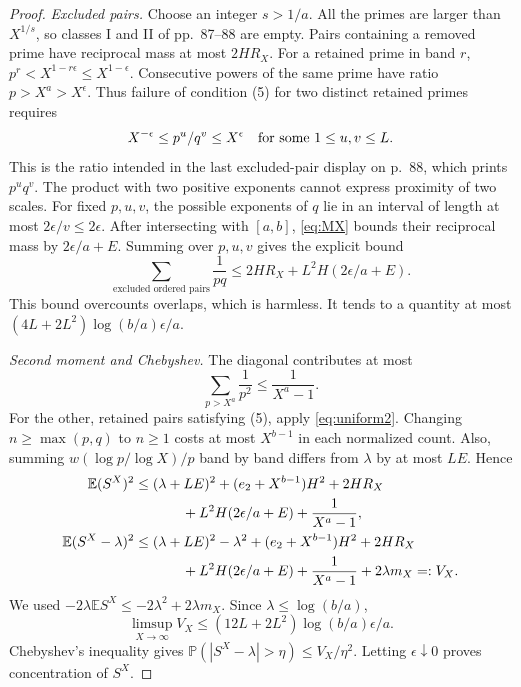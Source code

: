 \documentclass[10pt]{article}
\theoremstyle{remark}
\newcommand{\E}{\mathbb E}
\newcommand{\Prob}{\mathbb P}
\begin{document}
\begin{proof}
\emph{Excluded pairs.} Choose an integer $s>1/a$. All the primes are
larger than $X^{1/s}$, so classes I and II of pp.~87--88 are empty.
Pairs containing a removed prime have reciprocal mass at most $2HR_X$.
For a retained prime in band $r$, $p^r<X^{1-r\epsilon}\leq
X^{1-\epsilon}$. Consecutive powers of the same prime have ratio
$p>X^a>X^\epsilon$. Thus failure of condition (5) for two distinct
retained primes requires
\begin{equation}\label{eq:ratio}
 X^{-\epsilon}\leq p^u/q^v\leq X^\epsilon
 \quad\hbox{for some }1\leq u,v\leq L.
\end{equation}
This is the ratio intended in the last excluded-pair display on p.~88,
which prints $p^u q^v$. The product with two positive exponents cannot
express proximity of two scales.
For fixed $p,u,v$, the possible exponents of $q$ lie in an interval
of length at most $2\epsilon/v\leq2\epsilon$. After intersecting with
$[a,b]$, \eqref{eq:MX} bounds their reciprocal mass by
$2\epsilon/a+E$. Summing over $p,u,v$ gives the explicit bound
\begin{equation}\label{eq:badpairs}
 \sum_{\text{excluded ordered pairs}}\frac1{pq}
 \leq2HR_X+L^2H(2\epsilon/a+E).
\end{equation}
This bound overcounts overlaps, which is harmless. It tends to a
quantity at most $(4L+2L^2)\log(b/a)\epsilon/a$.

\emph{Second moment and Chebyshev.} The diagonal contributes at most
\[
 \sum_{p>X^a}\frac1{p^2}\leq\frac1{X^a-1}.
\]
For the other, retained pairs satisfying (5), apply \eqref{eq:uniform2}.
Changing $n\geq\max(p,q)$ to $n\geq1$ costs at most $X^{b-1}$ in
each normalized count. Also, summing $w(\log p/\log X)/p$ band by
band differs from $\lambda$ by at most $LE$. Hence
\begin{align}
 \E (S^X)^2&\leq (\lambda+LE)^2+(e_2+X^{b-1})H^2+2HR_X\notag\\
 &\hspace{12mm}+L^2H(2\epsilon/a+E)+\frac1{X^a-1},\label{eq:second}\\
 \E(S^X-\lambda)^2&\leq
 (\lambda+LE)^2-\lambda^2+(e_2+X^{b-1})H^2+2HR_X\notag\\
 &\hspace{12mm}+L^2H(2\epsilon/a+E)+\frac1{X^a-1}
       +2\lambda m_X=:V_X.\label{eq:variance}
\end{align}
We used $-2\lambda\E S^X\leq-2\lambda^2+2\lambda m_X$.
Since $\lambda\leq\log(b/a)$,
\[
 \limsup_{X\to\infty}V_X
 \leq(12L+2L^2)\log(b/a)\epsilon/a.
\]
Chebyshev's inequality gives
$\Prob(|S^X-\lambda|>\eta)\leq V_X/\eta^2$. Letting
$\epsilon\downarrow0$ proves concentration of $S^X$.


\end{proof}
\end{document}
